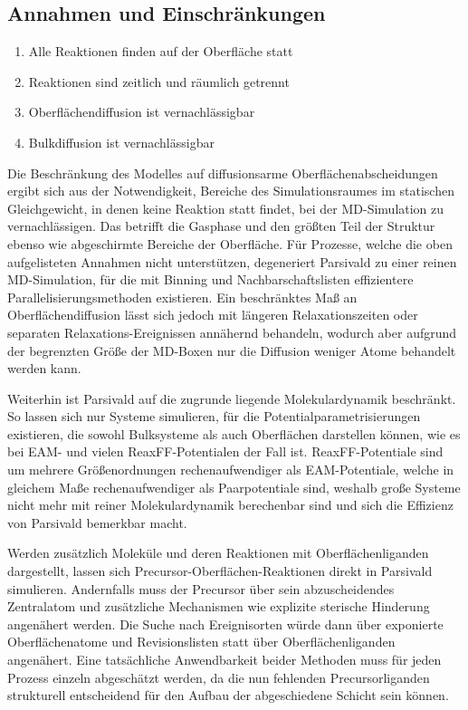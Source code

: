\subsection{Annahmen und Einschränkungen}

\begin{enumerate}
\item Alle Reaktionen finden auf der Oberfläche statt
\item Reaktionen sind zeitlich und räumlich getrennt
\item Oberflächendiffusion ist vernachlässigbar
\item Bulkdiffusion ist vernachlässigbar
\end{enumerate}

Die Beschränkung des Modelles auf diffusionsarme Oberflächenabscheidungen ergibt sich aus der Notwendigkeit, Bereiche des Simulationsraumes im statischen Gleichgewicht, in denen keine Reaktion statt findet, bei der MD-Simulation zu vernachlässigen.
Das betrifft die Gasphase und den größten Teil der Struktur ebenso wie abgeschirmte Bereiche der Oberfläche.
Für Prozesse, welche die oben aufgelisteten Annahmen nicht unterstützen, degeneriert Parsivald zu einer reinen MD-Simulation, für die mit Binning und Nachbarschaftslisten effizientere Parallelisierungsmethoden existieren.
Ein beschränktes Maß an Oberflächendiffusion lässt sich jedoch mit längeren Relaxationszeiten oder separaten Relaxations-Ereignissen annähernd behandeln, wodurch aber aufgrund der begrenzten Größe der MD-Boxen nur die Diffusion weniger Atome behandelt werden kann.

Weiterhin ist Parsivald auf die zugrunde liegende Molekulardynamik beschränkt.
So lassen sich nur Systeme simulieren, für die Potentialparametrisierungen existieren, die sowohl Bulksysteme als auch Oberflächen darstellen können, wie es bei EAM- und vielen ReaxFF-Potentialen der Fall ist.
ReaxFF-Potentiale sind um mehrere Größenordnungen rechenaufwendiger als EAM-Potentiale, welche in gleichem Maße rechenaufwendiger als Paarpotentiale sind, weshalb große Systeme nicht mehr mit reiner Molekulardynamik berechenbar sind und sich die Effizienz von Parsivald bemerkbar macht.

Werden zusätzlich Moleküle und deren Reaktionen mit Oberflächenliganden dargestellt, lassen sich Precursor-Oberflächen-Reaktionen direkt in Parsivald simulieren.
Andernfalls muss der Precursor über sein abzuscheidendes Zentralatom und zusätzliche Mechanismen wie explizite sterische Hinderung angenähert werden.
Die Suche nach Ereignisorten würde dann über exponierte Oberflächenatome und Revisionslisten statt über Oberflächenliganden angenähert.
Eine tatsächliche Anwendbarkeit beider Methoden muss für jeden Prozess einzeln abgeschätzt werden, da die nun fehlenden Precursorliganden strukturell entscheidend für den Aufbau der abgeschiedene Schicht sein können.

